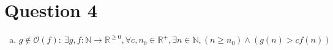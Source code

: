 \documentclass[12pt]{article}
\begin{document}
\section*{Question 4}
\begin{enumerate}[a.]
    \item
    $g \notin \mathcal{O}(f):\:\exists g,f:\mathbb{N} \to \mathbb{R}^{\geq 0},
    \forall c,n_0 \in \mathbb{R}^{+}, \exists n \in \mathbb{N}, (n \geq n_0) \land
    (g(n) > cf(n))$

\end{enumerate}
\end{document}
